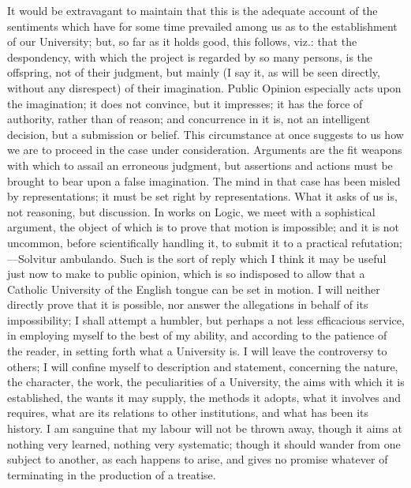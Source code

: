 It would be extravagant to maintain that this is the adequate
account of the sentiments which have for some time prevailed among us
as to the establishment of our University; but, so far as it holds
good, this follows, viz.: that the despondency, with which the project
is regarded by so many persons, is the offspring, not of their
judgment, but mainly (I say it, as will be seen directly, without any
disrespect) of their imagination. Public Opinion especially acts
upon the imagination; it does not convince, but it impresses; it has
the force of authority, rather than of reason; and concurrence in it
is, not an intelligent decision, but a submission or belief. This
circumstance at once suggests to us how we are to proceed in the case
under consideration. Arguments are the fit weapons with which to
assail an erroneous judgment, but assertions and actions must be
brought to bear upon a false imagination. The mind in that case has
been misled by representations; it must be set right by
representations. What it asks of us is, not reasoning, but discussion.
In works on Logic, we meet with a sophistical argument, the object of
which is to prove that motion is impossible; and it is not uncommon,
before scientifically handling it, to submit it to a practical
refutation;—Solvitur ambulando. Such is the sort of reply which I
think it may be useful just now to make to public opinion, which is so
indisposed to allow that a Catholic University of the English tongue
can be set in motion. I will neither directly prove that it is
possible, nor answer the allegations in behalf of its impossibility; I
shall attempt a humbler, but perhaps a not less efficacious service,
in employing myself to the best of my ability, and according to the
patience of the reader, in setting forth what a University is. I will
leave the controversy to others; I will confine myself to description
and statement, concerning the nature, the character, the work, the
peculiarities of a University, the aims with which it is established,
the wants it may supply, the methods it adopts, what it involves and
requires, what are its relations to other institutions, and what has
been its history. I am sanguine that my labour will not be thrown
away, though it aims at nothing very learned, nothing very systematic;
though it should wander from one subject to another, as each
happens to arise, and gives no promise whatever of terminating in the
production of a treatise.

